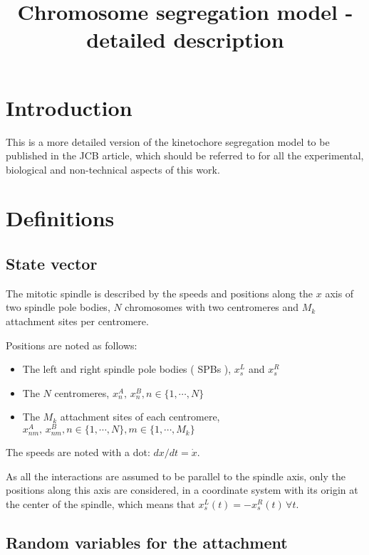 \documentclass[a4paper,12pt]{article}
\title{Chromosome segregation model - detailed description}
\begin{document}


\maketitle{}


\section*{Introduction}

This is a more detailed version of the kinetochore segregation model
to be published in the JCB article, which should be referred to for
all the experimental, biological and non-technical aspects of this
work.

 
\section{Definitions}
\label{sec:defs}

\subsection{State vector}

The mitotic spindle is described by the speeds and positions along the
$x$ axis of two spindle pole bodies, $N$ chromosomes with two
centromeres and $M_k$ attachment sites per centromere.

Positions are noted as follows:
\begin{itemize}
\item The left and right spindle pole bodies ( SPBs ), $x_s^L$ and $x_s^R$
\item The $N$ centromeres, $x_n^A, \, x_n^B, n \in \{1,\cdots, N\}$
\item The $M_k$ attachment sites of each centromere, $x_{nm}^A, \,
  x_{nm}^B, n \in \{1, \cdots, N \}, m \in \{1, \cdots, M_k\}$
\end{itemize}
The speeds are noted with a dot: $dx / dt = \dot{x}$.

As all the interactions are assumed to be parallel to the spindle
axis, only the positions along this axis are considered, in a coordinate
system with its origin at the center of the spindle, which means that
$x_s^L(t) = - x_s^R(t)\, \forall t$.

\subsection{Random variables for the attachment}
\end{document}
